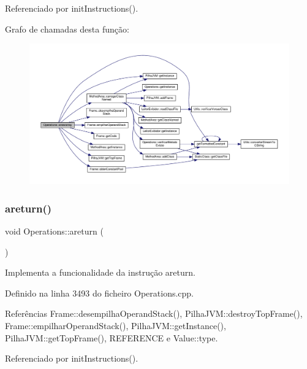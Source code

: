 Referenciado por init\+Instructions().

Grafo de chamadas desta função\+:\nopagebreak
\begin{figure}[H]
\begin{center}
\leavevmode
\includegraphics[width=350pt]{classOperations_aa5110e66aa565e9130be292935ef5c71_cgraph}
\end{center}
\end{figure}
\mbox{\label{classOperations_a5829421b72f92d50dea0461953b26c5b}} 
\subsubsection{\texorpdfstring{areturn()}{areturn()}}
{\footnotesize\ttfamily void Operations\+::areturn (\begin{DoxyParamCaption}{ }\end{DoxyParamCaption})\hspace{0.3cm}{\ttfamily [private]}}



Implementa a funcionalidade da instrução areturn. 



Definido na linha 3493 do ficheiro Operations.\+cpp.



Referências Frame\+::desempilha\+Operand\+Stack(), Pilha\+J\+V\+M\+::destroy\+Top\+Frame(), Frame\+::empilhar\+Operand\+Stack(), Pilha\+J\+V\+M\+::get\+Instance(), Pilha\+J\+V\+M\+::get\+Top\+Frame(), R\+E\+F\+E\+R\+E\+N\+CE e Value\+::type.



Referenciado por init\+Instructions().

